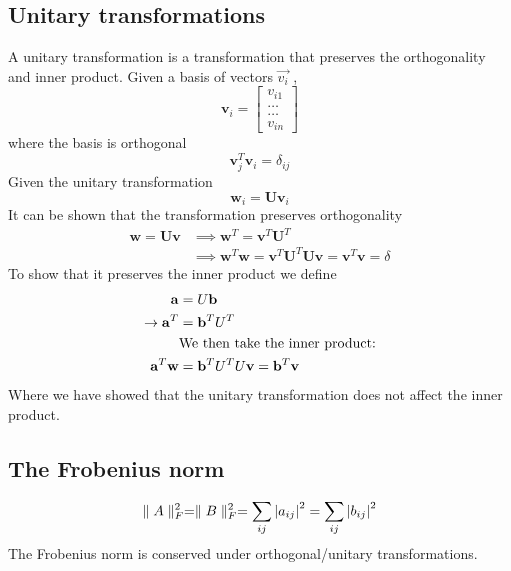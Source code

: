 \documentclass[%
reprint,
amsmath,amssymb,
aps,
]{revtex4-1}
\begin{document}
\subsection{Unitary transformations} \noindent 
A unitary transformation is a transformation that preserves the orthogonality and inner product. Given a basis of vectors $\vec{v_i}$ ,
\begin{equation*}
	\mathbf{v}_i = \begin{bmatrix} v_{i1} \\ \dots \\ \dots \\v_{in} \end{bmatrix}
\end{equation*}
where the basis is orthogonal 
\begin{equation*}
	\mathbf{v}_j^T\mathbf{v}_i = \delta_{ij}
\end{equation*}
Given the unitary transformation 
\begin{equation*}
	\mathbf{w}_i=\mathbf{U}\mathbf{v}_i
\end{equation*}
It can be shown that the transformation preserves orthogonality
\begin{align*}
	\mathbf{w}=\mathbf{U}\mathbf{v} &\implies \mathbf{w}^T=\mathbf{v}^T\mathbf{U}^T \\ &\implies \mathbf{w}^T\mathbf{w} = \mathbf{v}^T\mathbf{U}^T\mathbf{U}\mathbf{v} = \mathbf{v}^T\mathbf{v} = \delta
\end{align*}
To show that it preserves the inner product we define 
\begin{align*}
	\mathbf{a} &= U\mathbf{b} \\
	\rightarrow \mathbf{a}^T &= \mathbf{b}^TU^T \\
	&\textnormal{We then take the inner product:} \\
	 \mathbf{a}^T\mathbf{w} &= \mathbf{b}^TU^TU\mathbf{v} = \mathbf{b}^T\mathbf{v}
\end{align*}
Where we have showed that the unitary transformation does not affect the inner product. 

\subsection{The Frobenius norm}
\begin{equation}
	\parallel A \parallel_F^2 = \parallel B \parallel_F^2 = \sum_{ij} \abs{a_{ij}}^2 = \sum_{ij} \abs{b_{ij}}^2
\end{equation}
The Frobenius norm is conserved under orthogonal/unitary transformations. 
\end{document}
